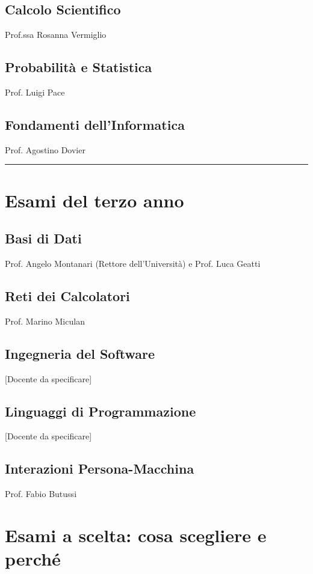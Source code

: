 \documentclass[18pt]{extarticle}
\begin{document}
\subsection{Calcolo Scientifico}
Prof.ssa Rosanna Vermiglio

\subsection{Probabilità e Statistica}
Prof. Luigi Pace

\subsection{Fondamenti dell'Informatica}
Prof. Agostino Dovier

\noindent\rule{\textwidth}{0.6pt}

\section{Esami del terzo anno}
\subsection{Basi di Dati}
Prof. Angelo Montanari (Rettore dell'Università) e Prof. Luca Geatti

\subsection{Reti dei Calcolatori}
Prof. Marino Miculan

\subsection{Ingegneria del Software}
[Docente da specificare]

\subsection{Linguaggi di Programmazione}
[Docente da specificare]

\subsection{Interazioni Persona-Macchina}
Prof. Fabio Butussi

\section{Esami a scelta: cosa scegliere e perché}
\end{document}
